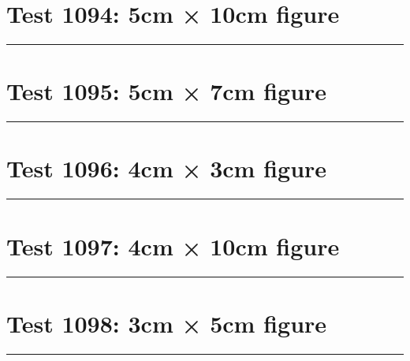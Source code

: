 \documentclass[a4paper,11pt]{article}
\begin{document}
\section*{Test 1094: 5cm × 10cm figure}
\begin{swarmwrap}%
  \begin{minipage}[t]{5cm}
    \centering
    \rule{\linewidth}{10cm}
  \end{minipage}%
\end{swarmwrap}%
\swarmwrapnext
\lipsum[20]
\lipsum[21]
\lipsum[22]
\lipsum[23]
\lipsum[24]
\section*{Test 1095: 5cm × 7cm figure}
\begin{swarmwrap}%
  \begin{minipage}[t]{5cm}
    \centering
    \rule{\linewidth}{7cm}
  \end{minipage}%
\end{swarmwrap}%
\swarmwrapnext
\lipsum[49]
\lipsum[50]
\lipsum[51]
\lipsum[52]
\section*{Test 1096: 4cm × 3cm figure}
\begin{swarmwrap}%
  \begin{minipage}[t]{4cm}
    \centering
    \rule{\linewidth}{3cm}
  \end{minipage}%
\end{swarmwrap}%
\swarmwrapnext
\lipsum[108]
\lipsum[109]
\lipsum[110]
\lipsum[111]
\section*{Test 1097: 4cm × 10cm figure}
\begin{swarmwrap}%
  \begin{minipage}[t]{4cm}
    \centering
    \rule{\linewidth}{10cm}
  \end{minipage}%
\end{swarmwrap}%
\swarmwrapnext
\lipsum[25]
\lipsum[26]
\lipsum[27]
\lipsum[28]
\lipsum[29]
\lipsum[30]
\section*{Test 1098: 3cm × 5cm figure}
\begin{swarmwrap}%
  \begin{minipage}[t]{3cm}
    \centering
    \rule{\linewidth}{5cm}
  \end{minipage}%
\end{swarmwrap}%
\swarmwrapnext
\lipsum[86]
\lipsum[87]
\lipsum[88]
\lipsum[89]
\end{document}
